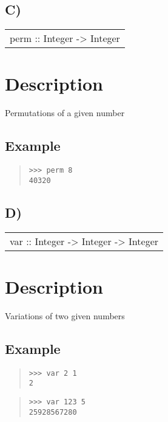 \subsection{C)}
\begin{haddockdesc}
\item[\begin{tabular}{@{}l}
perm :: Integer -> Integer
\end{tabular}]
{\haddockbegindoc
\section*{Description}
Permutations of a given number\par
\subsection*{Example}
\begin{quote}
{\haddockverb\begin{verbatim}
>>> perm 8
40320

\end{verbatim}}
\end{quote}}
\end{haddockdesc}
\subsection{D)}
\begin{haddockdesc}
\item[\begin{tabular}{@{}l}
var :: Integer -> Integer -> Integer
\end{tabular}]
{\haddockbegindoc
\section*{Description}
Variations of two given numbers\par
\subsection*{Example}
\begin{quote}
{\haddockverb\begin{verbatim}
>>> var 2 1
2

\end{verbatim}}
\end{quote}
\begin{quote}
{\haddockverb\begin{verbatim}
>>> var 123 5
25928567280

\end{verbatim}}
\end{quote}}
\end{haddockdesc}
